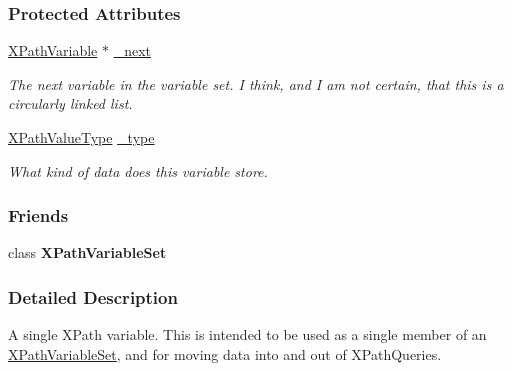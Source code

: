 \subsubsection*{Protected Attributes}
\begin{DoxyCompactItemize}
\item 
\hypertarget{classphys_1_1xml_1_1XPathVariable_abe57b58f8b6d2622d5e1ae93bc5361a3}{
\hyperlink{classphys_1_1xml_1_1XPathVariable}{XPathVariable} $\ast$ \hyperlink{classphys_1_1xml_1_1XPathVariable_abe57b58f8b6d2622d5e1ae93bc5361a3}{\_\-next}}
\label{classphys_1_1xml_1_1XPathVariable_abe57b58f8b6d2622d5e1ae93bc5361a3}

\begin{DoxyCompactList}\small\item\em The next variable in the variable set. I think, and I am not certain, that this is a circularly linked list. \item\end{DoxyCompactList}\item 
\hypertarget{classphys_1_1xml_1_1XPathVariable_a8841d47677912f4b88743928cf931eac}{
\hyperlink{namespacephys_1_1xml_a339b9eef674ba44100110e5524bc575d}{XPathValueType} \hyperlink{classphys_1_1xml_1_1XPathVariable_a8841d47677912f4b88743928cf931eac}{\_\-type}}
\label{classphys_1_1xml_1_1XPathVariable_a8841d47677912f4b88743928cf931eac}

\begin{DoxyCompactList}\small\item\em What kind of data does this variable store. \item\end{DoxyCompactList}\end{DoxyCompactItemize}
\subsubsection*{Friends}
\begin{DoxyCompactItemize}
\item 
\hypertarget{classphys_1_1xml_1_1XPathVariable_a6d8e28205e67fa0164160dd3cb547fe6}{
class {\bfseries XPathVariableSet}}
\label{classphys_1_1xml_1_1XPathVariable_a6d8e28205e67fa0164160dd3cb547fe6}

\end{DoxyCompactItemize}


\subsubsection{Detailed Description}
A single XPath variable. This is intended to be used as a single member of an \hyperlink{classphys_1_1xml_1_1XPathVariableSet}{XPathVariableSet}, and for moving data into and out of XPathQueries. 

